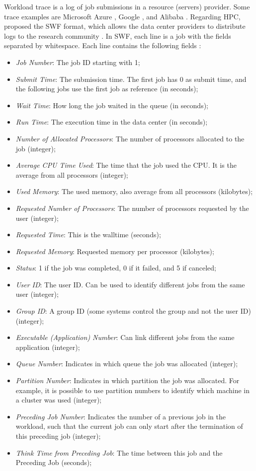 Workload trace is a log of job submissions in a resource (servers) provider. Some trace examples are Microsoft Azure \cite{cortez2017resource}, Google \cite{reiss2011google}, and Alibaba \cite{wang2022characterizing}. Regarding HPC, \citeauthor{feitelson2014experience} proposed the SWF format, which allows the data center providers to distribute logs to the research community \cite{feitelson2014experience}. In SWF, each line is a job with the fields separated by whitespace. Each line contains the following fields \cite{feitelson2014experience}:
\begin{itemize}
    \item \textit{Job Number}: The job ID starting with 1;
    \item \textit{Submit Time}: The submission time. The first job has 0 as submit time, and the following jobs use the first job as reference (in seconds);
    \item \textit{Wait Time}: How long the job waited in the queue (in seconds);
    \item \textit{Run Time}: The execution time in the data center (in seconds);
    \item \textit{Number of Allocated Processors}: The number of processors allocated to the job (integer);
    \item \textit{Average CPU Time Used}: The time that the job used the CPU. It is the average from all processors (integer);
    \item \textit{Used Memory}: The used memory, also average from all processors (kilobytes);
    \item \textit{Requested Number of Processors}: The number of processors requested by the user (integer);
    \item \textit{Requested Time}: This is the walltime (seconds);
    \item \textit{Requested Memory}: Requested memory per processor  (kilobytes);
    \item \textit{Status}: 1 if the job was completed, 0 if it failed, and 5 if canceled;
    \item \textit{User ID}: The user ID. Can be used to identify different jobs from the same user (integer);
    \item \textit{Group ID}: A group ID (some systems control the group and not the user ID) (integer);
    \item \textit{Executable (Application) Number}: Can link different jobs from the same application (integer);
    \item \textit{Queue Number}: Indicates in which queue the job was allocated (integer);
    \item \textit{Partition Number}: Indicates in which partition the job was allocated. For example, it is possible to use partition numbers to identify which machine in a cluster was used (integer);
    \item \textit{Preceding Job Number}: Indicates the number of a previous job in the workload, such that the current job can only start after the termination of this preceding job (integer);
    \item \textit{Think Time from Preceding Job}: The time between this job and the Preceding Job (seconds);
\end{itemize}

